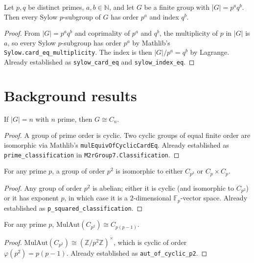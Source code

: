 \begin{lemma}
    \label{lem:sylow-card-index}
    Let $p, q$ be distinct primes, $a, b \in \mathbb{N}$, and let $G$ be a
    finite group with $|G| = p^a q^b$. Then every Sylow $p$-subgroup of $G$
    has order $p^a$ and index $q^b$.
\end{lemma}
\begin{proof}
    From $|G| = p^a q^b$ and coprimality of $p^a$ and $q^b$, the multiplicity
    of $p$ in $|G|$ is $a$, so every Sylow $p$-subgroup has order $p^a$ by
    Mathlib's \texttt{Sylow.card\_eq\_multiplicity}. The index is then
    $|G|/p^a = q^b$ by Lagrange. Already established as
    \texttt{sylow\_card\_eq} and \texttt{sylow\_index\_eq}.
\end{proof}

\section{Background results}

\begin{lemma}
    \label{lem:prime-classification}
    If $|G| = n$ with $n$ prime, then $G \cong C_n$.
\end{lemma}
\begin{proof}
    A group of prime order is cyclic. Two cyclic groups of equal finite order
    are isomorphic via Mathlib's \texttt{mulEquivOfCyclicCardEq}. Already
    established as \texttt{prime\_classification} in
    \texttt{M2rGroup7.Classification}.
\end{proof}

\begin{lemma}
    \label{lem:p-squared-classification}
    For any prime $p$, a group of order $p^2$ is isomorphic to either
    $C_{p^2}$ or $C_p \times C_p$.
\end{lemma}
\begin{proof}
    Any group of order $p^2$ is abelian; either it is cyclic (and isomorphic
    to $C_{p^2}$) or it has exponent $p$, in which case it is a $2$-dimensional
    $\mathbb{F}_p$-vector space. Already established as
    \texttt{p\_squared\_classification}.
\end{proof}

\begin{lemma}
    \label{lem:aut-cyclic-p2}
    For any prime $p$, $\mathrm{MulAut}(C_{p^2}) \cong C_{p(p-1)}$.
\end{lemma}
\begin{proof}
    $\mathrm{MulAut}(C_{p^2}) \cong (\mathbb{Z}/p^2 \mathbb{Z})^\times$, which is
    cyclic of order $\varphi(p^2) = p(p-1)$. Already established as
    \texttt{aut\_of\_cyclic\_p2}.
\end{proof}

